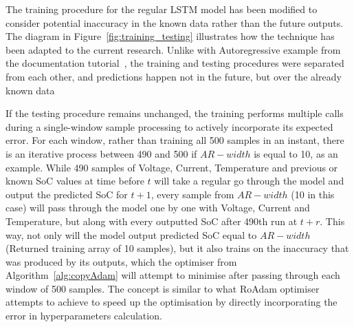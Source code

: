 %
%
{The} training procedure for the regular LSTM model has been modified to consider potential inaccuracy in the known data rather than the future outputs.
The diagram in Figure~\ref{fig:training_testing} illustrates how the technique has been adapted to the current research.
{Unlike with Autoregressive example from the documentation tutorial~\cite{time_2020}, the training and testing procedures were separated from each other, and predictions happen not in the future, but over the already known data}

%
If the testing procedure remains unchanged, the training performs multiple calls during a single-window sample processing to actively incorporate its expected error.
For each window, rather than training all 500 samples in an instant, there is an iterative process between 490 and 500 if $AR-width$ is equal to 10, as an example.
While 490 samples of Voltage, Current, Temperature and previous or known SoC values at time before $t$ will take a regular go through the model and output the predicted SoC for $t+1$, every sample from $AR-width$ (10 in this case) will pass through the model one by one with Voltage, Current and Temperature, but along with every outputted SoC after 490th run at $t+r$.
This way, not only will the model output predicted SoC equal to $AR-width$ (Returned training array of 10 samples), but it also trains on the inaccuracy that was produced by its outputs, which the optimiser from Algorithm~\ref{alg:copyAdam} will attempt to minimise after passing through each window of 500 samples.
The concept is similar to what RoAdam optimiser attempts to achieve to speed up the optimisation by directly incorporating the error in hyperparameters calculation.

